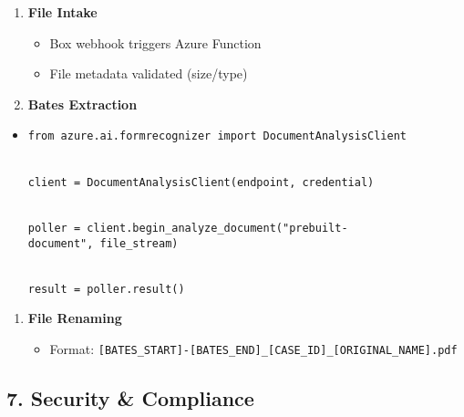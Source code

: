 \documentclass[
]{article}
\providecommand{\tightlist}{%
  \setlength{\itemsep}{0pt}\setlength{\parskip}{0pt}}
\begin{document}
\begin{enumerate}
\def\labelenumi{\arabic{enumi}.}
\item
  \textbf{File Intake}

  \begin{itemize}
  \tightlist
  \item
    Box webhook triggers Azure Function
  \item
    File metadata validated (size/type)
  \end{itemize}
\item
  \textbf{Bates Extraction}
\end{enumerate}

\begin{itemize}
\item
  \texttt{from\ azure.ai.formrecognizer\ import\ DocumentAnalysisClient}\strut \\
  \texttt{client\ =\ DocumentAnalysisClient(endpoint,\ credential)}\strut \\
  \texttt{poller\ =\ client.begin\_analyze\_document("prebuilt-document",\ file\_stream)}\strut \\
  \texttt{result\ =\ poller.r}\texttt{esult()}
\end{itemize}

\begin{enumerate}
\def\labelenumi{\arabic{enumi}.}
\setcounter{enumi}{2}
\item
  \textbf{File Renaming}

  \begin{itemize}
  \tightlist
  \item
    Format:
    \texttt{{[}BATES\_START{]}-{[}BATES\_}\texttt{END{]}\_}\texttt{{[}CASE\_ID{]}\_{[}ORIGINAL\_NAME{]}.pdf}
  \end{itemize}
\end{enumerate}

\hypertarget{security-compliance}{%
\subsection{\texorpdfstring{\textbf{7. Security \&
Compliance}}{7. Security \& Compliance}}\label{security-compliance}}
\end{document}
